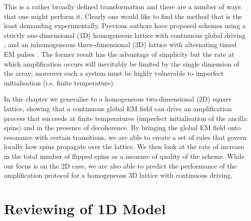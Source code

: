This is a rather broadly defined transformation and there are a number of ways that one might perform it. Clearly one would like to find the method that is the least demanding experimentally. Previous authors have proposed schemes using a strictly one-dimensional (1D) homogeneous lattice with continuous global driving \cite{Lee:2005p6468}, and an inhomogeneous three-dimensional (3D) lattice with alternating timed EM pulses \cite{PerezDelgado:2006p6542}. The former result has the advantage of simplicity but the rate at which amplification occurs will inevitably be limited by the single dimension of the array; moreover such a system must be highly vulnerable to imperfect initialisation (i.e. finite temperature).

In this chapter we generalise to a homogeneous two-dimensional (2D) square lattice, showing that a continuous global EM field can drive an amplification process that succeeds at finite temperatures (imperfect initialisation of the ancilla spins) and in the presence of decoherence. By bringing the global EM field onto resonance with certain transitions, we are able to create a set of rules that govern locally how spins propagate over the lattice. We then look at the rate of increase in the total number of flipped spins as a measure of quality of the scheme. While our focus is on the 2D case, we are also able to predict the performance of the amplification protocol for a homogeneous 3D lattice with continuous driving.

\section{Reviewing of 1D Model}

